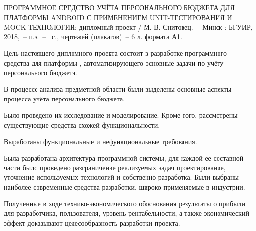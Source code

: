 \thispagestyle{empty}


\MakeUppercase{Программное средство учёта персонального бюджета для платформы Android с применением Unit-\-тес\-ти\-ро\-ва\-ния и Mock технологии}: дипломный проект / М. В. Снитовец.~-- Минск : БГУИР, 2018,~-- п.з.~-- \totalpages~с., чертежей (плакатов)~-- 6 л. формата А1.
\vspace{\baselineskip}

Цель настоящего дипломного проекта состоит в  разработке программного средства для платформы \andro, автоматизирующего основные задачи по учёту персонального бюджета.

В процессе анализа предметной области были выделены основные аспекты процесса учёта персонального бюджета.

Было проведено их исследование и моделирование.
Кроме того, рассмотрены существующие средства схожей функциональности.

Выработаны функциональные и нефункциональные требования.

Была разработана архитектура программной системы, для каждой ее составной части было проведено разграничение реализуемых задач проектирование, уточнение используемых технологий и собственно разработка.
Были выбраны наиболее современные средства разработки, широко применяемые в индустрии.

Полученные в ходе технико-экономического обоснования результаты о прибыли для разработчика, пользователя, уровень рентабельности, а также экономический эффект доказывают целесообразность разработки про\-екта.
